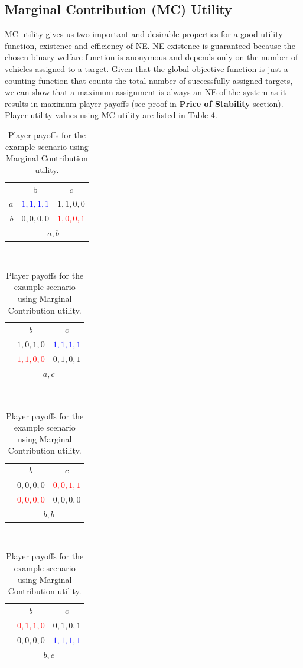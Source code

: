 \documentclass[defaultstyle,12pt]{proposal}
\begin{document}
\subsection{Marginal Contribution (MC) Utility}
MC utility gives us two important and desirable properties for a good utility function, existence and efficiency of NE. NE existence is guaranteed because the chosen binary welfare function is anonymous and  depends only on the number of vehicles assigned to a target\cite{Monderer1996}. Given that the global objective function is just a counting function that counts the total number of successfully assigned targets, we can show that a maximum assignment is always an NE of the system as it results in maximum player payoffs (see proof in \textbf{Price of Stability} section). Player utility values using MC utility are listed in Table \ref{tab:mcUtil}.  

\begin{table}[!htb]
	\centering\begin{tabular}{r|c|c|}
	\multicolumn{1}{c}{}
	& \multicolumn{1}{c}{b}
	& \multicolumn{1}{c}{$c$}\\
	\cline{2-3}
	$a$ & \textcolor{blue}{$1,1,1,1$} & $1,1,0,0$\\
	\cline{2-3}
	$b$ & $0,0,0,0$ & \textcolor{red}{$1,0,0,1$}\\
	\cline{2-3}
	\multicolumn{1}{c}{}
	& \multicolumn{2}{c}{$a,b$}
	\end{tabular}~
	\centering\begin{tabular}{r|c|c|}
	\multicolumn{1}{c}{}
	& \multicolumn{1}{c}{$b$}
	& \multicolumn{1}{c}{$c$}\\
	\cline{2-3}
	& $1,0,1,0$ & \textcolor{blue}{$1,1,1,1$}\\
	\cline{2-3}
	& \textcolor{red}{$1,1,0,0$} & $0,1,0,1$\\
	\cline{2-3}
	\multicolumn{1}{c}{}
	& \multicolumn{2}{c}{$a,c$}
	\end{tabular}~
	\centering\begin{tabular}{r|c|c|}
	\multicolumn{1}{c}{}
	& \multicolumn{1}{c}{$b$}
	& \multicolumn{1}{c}{$c$}\\
	\cline{2-3}
	& $0,0,0,0$ & \textcolor{red}{$0,0,1,1$}\\
	\cline{2-3}
	& \textcolor{red}{$0,0,0,0$} & $0,0,0,0$\\
	\cline{2-3}
	\multicolumn{1}{c}{}
	& \multicolumn{2}{c}{$b,b$}
	\end{tabular}~
	\centering\begin{tabular}{r|c|c|}
	\multicolumn{1}{c}{}
	& \multicolumn{1}{c}{$b$}
	& \multicolumn{1}{c}{$c$}\\
	\cline{2-3}
	& \textcolor{red}{$0,1,1,0$} & $0,1,0,1$\\
	\cline{2-3}
	& $0,0,0,0$ & \textcolor{blue}{$1,1,1,1$}\\
	\cline{2-3}
	\multicolumn{1}{c}{}
	& \multicolumn{2}{c}{$b,c$}
	\end{tabular}
	\centering\caption{Player payoffs for the example scenario using Marginal Contribution utility.}\label{tab:mcUtil}
\end{table}
\end{document}
